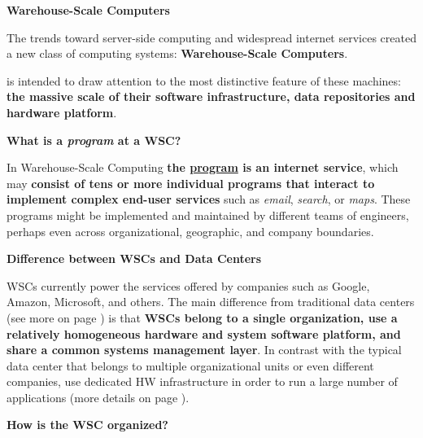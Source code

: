 \newpage

\begin{center}
    \textcolor{Red2}{\textbf{Warehouse-Scale Computers}}
\end{center}

\noindent
The trends toward server-side computing and widespread internet services created a new class of computing systems: \textbf{Warehouse-Scale Computers}.

\begin{definitionbox}
     is intended to draw attention to the most distinctive feature of these machines: \textbf{the massive scale of their software infrastructure, data repositories and hardware platform}.
\end{definitionbox}

\begin{flushleft}
    \textcolor{Green3}{ \textbf{What is a \emph{program} at a WSC?}}
\end{flushleft}

\noindent
In Warehouse-Scale Computing \textbf{the \underline{program} is an internet service}, which may \textbf{consist of tens or more individual programs that interact to implement complex end-user services} such as \emph{email}, \emph{search}, or \emph{maps}. These programs might be implemented and maintained by different teams of engineers, perhaps even across organizational, geographic, and company boundaries.

\begin{flushleft}
    \textcolor{Green3}{ \textbf{Difference between WSCs and Data Centers}}
\end{flushleft}

\noindent
WSCs currently power the services offered by companies such as Google, Amazon, Microsoft, and others. The main difference from traditional data centers (see more on page \pageref{Data Center definition}) is that \textbf{WSCs belong to a single organization, use a relatively homogeneous hardware and system software platform, and share a common systems management layer}. In contrast with the typical data center that belongs to multiple organizational units or even different companies, use dedicated HW infrastructure in order to run a large number of applications (more details on page \pageref{Data Center definition}).

\begin{flushleft}
    \textcolor{Green3}{ \textbf{How is the WSC organized?}}
\end{flushleft}

